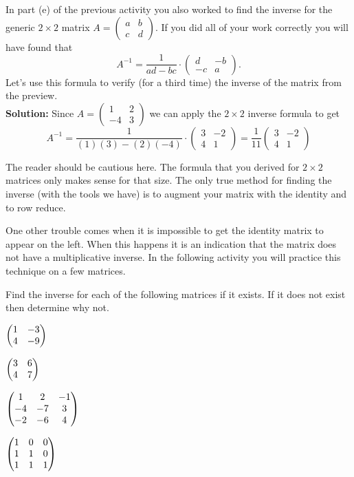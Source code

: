 \begin{example}
In part (e) of the previous activity you also worked to find the inverse for the generic
$2 \times 2$ matrix $A = \begin{pmatrix} a & b \\ c & d \end{pmatrix}$.  If you did all of
your work correctly you will have found that 
\[ A^{-1} = \frac{1}{ad-bc} \cdot \begin{pmatrix} d & -b \\ -c & a \end{pmatrix}. \]
Let's use this formula to verify (for a third time) the inverse of the matrix from the
preview.
\\{\bf Solution:}
Since $A = \begin{pmatrix} 1 & 2 \\ -4 & 3 \end{pmatrix}$ we can apply the $2 \times 2$
inverse formula to get
\[ A^{-1} = \frac{1}{(1)(3) - (2)(-4)} \cdot \begin{pmatrix} 3 & -2 \\ 4 & 1 \end{pmatrix}
= \frac{1}{11} \begin{pmatrix} 3 & -2 \\ 4 & 1 \end{pmatrix} \]
\end{example}
The reader should be cautious here.  The formula that you derived for $2 \times 2$
matrices only makes sense for that size.  The only true method for finding the inverse
(with the tools we have) is to augment your matrix with the identity and to row reduce.

One other trouble comes when it is impossible to get the identity matrix to appear on the
left.
When this happens it is an indication that the matrix does not have a multiplicative
inverse.  In the following activity you will practice this technique on a few matrices.
% 
% 
\begin{problem}
    Find the inverse for each of the following matrices if it exists.  If it does not
    exist then determine why not.
    \ba
        \item $\begin{pmatrix} 1 & -3 \\ 4 & -9 \end{pmatrix}$
        \item $\begin{pmatrix} 3 & 6 \\ 4 & 7 \end{pmatrix}$
        \item $\begin{pmatrix} 1 & 2 & -1 \\ -4 & -7 & 3 \\ -2 & -6 & 4 \end{pmatrix}$
        \item $\begin{pmatrix} 1 & 0 & 0 \\ 1 & 1 & 0 \\ 1 & 1 & 1 \end{pmatrix}$
    \ea

\end{problem}

